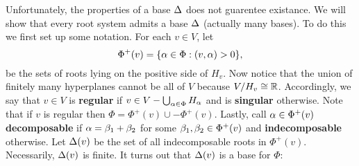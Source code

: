 \documentclass[12pt,reqno,oneside]{amsart}
\begin{document}
    Unfortunately, the properties of a base $\Delta$ does not guarentee existance. We will show that every root system admits a base $\Delta$ (actually many bases). To do this we first set up some notation. For each $v \in V$, let
    \[
        \Phi^{+}(v) = \{\alpha \in \Phi:(v,\alpha) > 0\},
    \]
    be the sets of roots lying on the positive side of $H_{v}$. Now notice that the union of finitely many hyperplanes cannot be all of $V$ because $V/H_{v} \cong \mathbb{R}$. Accordingly, we say that $v \in V$ is \textbf{regular} if $v \in V-\bigcup_{\alpha \in \Phi}H_{\alpha}$ and is \textbf{singular} otherwise. Note that if $v$ is regular then $\Phi = \Phi^{+}(v)\cup -\Phi^{+}(v)$. Lastly, call $\alpha \in \Phi^{+}(v)$ \textbf{decomposable} if $\alpha = \beta_{1}+\beta_{2}$ for some $\beta_{1},\beta_{2} \in \Phi^{+}(v)$ and \textbf{indecomposable} otherwise. Let $\Delta(v)$ be the set of all indecomposable roots in $\Phi^{+}(v)$. Necessarily, $\Delta(v)$ is finite. It turns out that $\Delta(v)$ is a base for $\Phi$:
\end{document}
